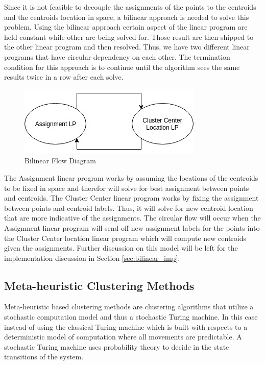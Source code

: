 \documentclass[a4paper,12pt]{article}
\numberwithin{equation}{section}
\begin{document}
Since it is not feasible to decouple the assignments of the points to the centroids and the centroids location in space, a bilinear approach is needed to solve this problem. Using the bilinear approach certain aspect of the linear program are held constant while other are being solved for. Those result are then shipped to the other linear program and then resolved. Thus, we have two different linear programs that have circular dependency on each other. The termination condition for this approach is to continue until the algorithm sees the same results twice in a row after each solve.  
\begin{figure}[H]
    \centering
    \includegraphics[scale = 0.55]{images/bilinear.jpeg}
    \caption{Bilinear Flow Diagram}
    \label{fig:bilinear_flow}
\end{figure}
The Assignment linear program works by assuming the locations of the centroids to be fixed in space and therefor will solve for best assignment between points and centroids. The Cluster Center linear program works by fixing the assignment between points and centroid labels. Thus, it will solve for new centroid location that are more indicative of the assignments. The circular flow will occur when the Assignment linear program will send off new assignment labels for the points into the Cluster Center location linear program which will compute new centroids given the assignments. Further discussion on this model will be left for the implementation discussion in Section \ref{sec:bilinear_imp}.

\subsection{Meta-heuristic Clustering Methods} \label{sec:metaheuristic}
Meta-heuristic based clustering methods are clustering algorithms that utilize a stochastic computation model and thus a stochastic Turing machine. In this case instead of using the classical Turing machine which is built with respects to a deterministic model of computation where all movements are predictable. 
A stochastic Turing machine uses probability theory to decide in the state transitions of the system. \\ 
\end{document}
